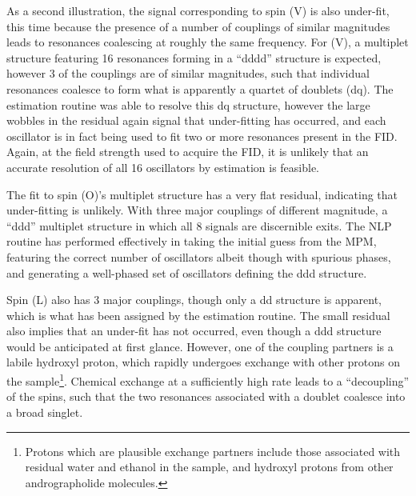 As a second illustration, the signal corresponding to spin (V) is also
under-fit, this time because the presence of a number of couplings of similar
magnitudes leads to resonances coalescing at roughly the same frequency. For
(V), a multiplet structure featuring 16 resonances forming in a ``dddd''
structure is expected, however 3 of the couplings are of similar magnitudes,
such that individual resonances coalesce to form what is apparently a quartet
of doublets (dq). The estimation routine was able to resolve this dq structure,
however the large wobbles in the residual again signal that under-fitting has
occurred, and each oscillator is in fact being used to fit two or more
resonances present in the \ac{FID}. Again, at the field strength used to
acquire the \ac{FID}, it is unlikely that an accurate resolution of all 16
oscillators by estimation is feasible.

The fit to spin (O)'s multiplet structure has a very flat residual, indicating
that under-fitting is unlikely. With three major couplings of
different magnitude, a ``ddd'' multiplet structure in which all 8 signals
are discernible exits. The \ac{NLP} routine has performed effectively in
taking the initial guess from the \ac{MPM}, featuring the correct number of
oscillators albeit though with spurious phases, and generating a well-phased
set of oscillators defining the ddd structure.

Spin (L) also has 3 major couplings, though only a
dd structure is apparent, which is what has been assigned by the estimation
routine. The small residual  also implies that an under-fit has not occurred,
even though a ddd structure would be anticipated at first glance. However, one
of the coupling partners is a labile hydroxyl proton, which rapidly undergoes
exchange with other protons on the sample\footnote{
    Protons which are plausible exchange partners include those associated with
    residual water and ethanol in the sample, and hydroxyl protons from other
    andrographolide molecules.
}. Chemical exchange at a sufficiently
high rate leads to a ``decoupling'' of the spins, such that the two resonances
associated with a doublet coalesce into a broad singlet\cite[Section
2.6.1.5]{Claridge2016}.


